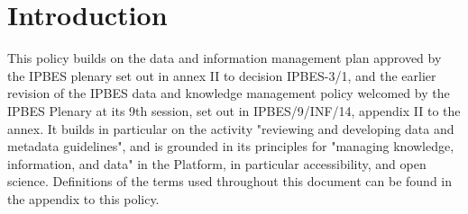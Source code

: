 \documentclass{article}
\begin{document}
\section{Introduction}

This policy builds on the data and information management plan approved by the IPBES \gls{plenary} set out in annex II to decision IPBES-3/1, and the earlier revision of the IPBES data and knowledge management policy welcomed by the IPBES Plenary at its 9th session, set out in IPBES/9/INF/14, appendix II to the annex. It builds in particular on the activity "reviewing and developing data and metadata guidelines", and is grounded in its principles for "managing knowledge, information, and data" in the Platform, in particular accessibility, and open science. Definitions of the terms used throughout this document can be found in the appendix to this policy.
\end{document}
